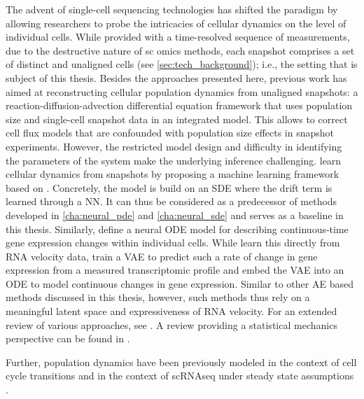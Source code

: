 The advent of single-cell sequencing technologies has shifted the paradigm by allowing researchers to probe the intricacies of cellular dynamics on the level of individual cells.
While provided with a time-resolved sequence of measurements, due to the destructive nature of \acrlong{sc} omics methods, each snapshot comprises a set of distinct and unaligned cells (see \cref{sec:tech_background}); i.e., the setting that is subject of this thesis.
Besides the approaches presented here, previous work has aimed at reconstructing cellular population dynamics from unaligned snapshots:
\citet{fischer2019inferring} a reaction-diffusion-advection differential equation framework that uses population size and single-cell snapshot data in an integrated model. This allows to correct cell flux models that are confounded with population size effects in snapshot experiments. However, the restricted model design and difficulty in identifying the parameters of the system make the underlying inference challenging.
\citet{hashimoto2016learning} learn cellular dynamics from snapshots by proposing a machine learning framework based on . Concretely, the model is build on an \acrshort{SDE} where the drift term is learned through a \acrlong{NN}. It can thus be considered as a predecessor of methods developed in \cref{cha:neural_pde} and \ref{cha:neural_sde} and serves as a baseline in this thesis.
Similarly, \citet{chen2022deepvelo, qiu2022mapping, tong2020trajectorynet, huguet2022manifold} define a neural \acrshort{ODE} model \citep{chen2018neural} for describing continuous-time gene expression changes within individual cells.
While \citet{qiu2022mapping} learn this directly from \acrshort{RNA} velocity data, \citet{chen2022deepvelo} train a \acrfull{VAE} to predict such a rate of change in gene expression from a measured transcriptomic profile and embed the \acrshort{VAE} into an \acrshort{ODE} to model continuous changes in gene expression.
Similar to other \acrshort{AE} based methods discussed in this thesis, however, such methods thus rely on a meaningful latent space and expressiveness of \acrshort{RNA} velocity.
For an extended review of various approaches, see \citet{ding2022temporal}. A review providing a statistical mechanics perspective can be found in \citet{teschendorff2021statistical}.

Further, population dynamics have been previously modeled in the context of cell cycle transitions \citep{kafri2013dynamics, kuritz2017relationship} and in the context of \acrshort{sc}\acrshort{RNAseq} under steady state assumptions \citep{weinreb2018fundamental}.

